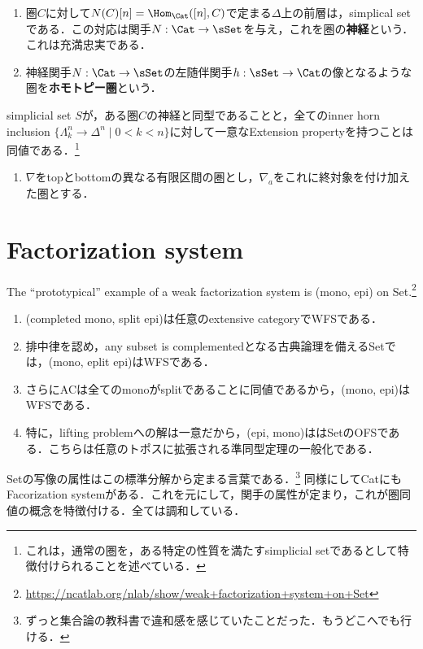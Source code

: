 \documentclass[uplatex,dvipdfmx]{jsreport}
\begin{document}
\begin{definition}\mbox{}
    \begin{enumerate}
        \item 圏$C$に対して$N(C)[n]=\Hom_\Cat([n],C)$で定まる$\Delta$上の前層は，simplical setである．この対応は関手$N:\Cat\to\sSet$を与え，これを圏の\textbf{神経}という．これは充満忠実である．
        \item 神経関手$N:\Cat\to\sSet$の左随伴関手$h:\sSet\to\Cat$の像となるような圏を\textbf{ホモトピー圏}という．
    \end{enumerate}
\end{definition}

\begin{proposition}
    simplicial set $S$が，ある圏$C$の神経と同型であることと，全てのinner horn inclusion $\{\Lambda^n_k\to\Delta^n\mid 0<k<n\}$に対して一意なExtension propertyを持つことは同値である．\footnote{これは，通常の圏を，ある特定の性質を満たすsimplicial setであるとして特徴付けられることを述べている．}
\end{proposition}

\begin{definition}\mbox{}
    \begin{enumerate}
        \item $\nabla$をtopとbottomの異なる有限区間の圏とし，$\nabla_a$をこれに終対象を付け加えた圏とする．
    \end{enumerate}
\end{definition}

\section{Factorization system}

\begin{tcolorbox}[colframe=ForestGreen, colback=ForestGreen!10!white, breakable ,colbacktitle=ForestGreen!40!white, coltitle=black,fonttitle=\bfseries\sffamily,
    title=]
    The “prototypical” example of a weak factorization system is (mono, epi) on Set.\footnote{\url{https://ncatlab.org/nlab/show/weak+factorization+system+on+Set}}
    \begin{enumerate}
        \item (completed mono, split epi)は任意のextensive categoryでWFSである．
        \item 排中律を認め，any subset is complementedとなる古典論理を備えるSetでは，(mono, eplit epi)はWFSである．
        \item さらにACは全てのmonoがsplitであることに同値であるから，(mono, epi)はWFSである．
        \item 特に，lifting problemへの解は一意だから，(epi, mono)ははSetのOFSである．こちらは任意のトポスに拡張される準同型定理の一般化である．
    \end{enumerate}
    Setの写像の属性はこの標準分解から定まる言葉である．\footnote{ずっと集合論の教科書で違和感を感じていたことだった．もうどこへでも行ける．}
    同様にしてCatにもFacorization systemがある．これを元にして，関手の属性が定まり，これが圏同値の概念を特徴付ける．全ては調和している．
\end{tcolorbox}
\end{document}

